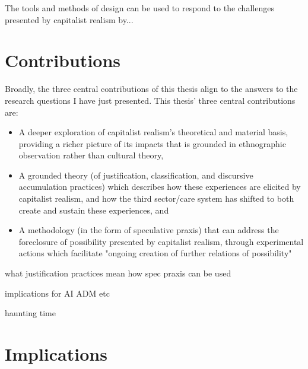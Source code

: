 The tools and methods of design can be used to respond to the challenges presented by capitalist realism by...


\section{Contributions}
Broadly, the three central contributions of this thesis align to the answers to the research questions I have just presented. This thesis' three central contributions are: 
\begin{itemize}
    \item A deeper exploration of capitalist realism's theoretical and material basis, providing a richer picture of its impacts that is grounded in ethnographic observation rather than cultural theory,
    \item  A grounded theory (of justification, classification, and discursive accumulation practices) which describes how these experiences are elicited by capitalist realism, and how the third sector/care system has shifted to both create and sustain these experiences, and
    \item A methodology (in the form of speculative praxis) that can address the foreclosure of possibility presented by capitalist realism, through experimental actions which facilitate "ongoing creation of further relations of possibility" 
\end{itemize}



what justification practices mean 
how spec praxis can be used

implications for AI ADM etc

haunting 
time




\section{Implications}

